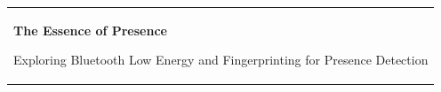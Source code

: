 %
\begin{titlepage}
\vspace*{\fill}
  \addtolength{\hoffset}{0.5\evensidemargin-0.5\oddsidemargin} %
  \noindent%
  {\color{white}\colorbox{aaublue}{\begin{tabular}{@{}p{\textwidth}@{}}
    \begin{center}
    \Huge{\textbf{
      The Essence of Presence
    }}
    \end{center}
    \begin{center}
      \Large{
        Exploring Bluetooth Low Energy and Fingerprinting for Presence Detection 
}
\end{center}
\end{tabular}}}
\end{titlepage}
